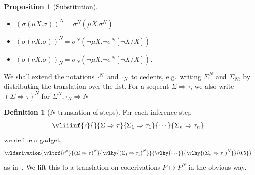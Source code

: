 \documentclass[10pt,a4paper]{amsart}
\theoremstyle{plain}
\newtheorem{proposition}[proposition]{Proposition}
\theoremstyle{definition}
\newtheorem{definition}[definition]{Definition}
\newcommand{\oldtodo}[1]{\todo{#1}} %
\newcommand{\red}[1]{{\color{red}#1}}
\renewcommand{\todo}[1]{}
\newcommand{\todonew}[1]{{\red{TodoNew: #1}}}
\renewcommand{\todonew}[1]{}
\theoremstyle{plain}
\theoremstyle{definition} %
\newcommand{\nat}{\mathit{N}}
\newcommand{\N}{\nat} %
\newcommand{\seqar}{\Rightarrow}
\newcommand{\infrule}{\mathsf{r}}
\newcommand{\rrule}{\infrule} %
\newcommand{\der}{P}
\newcommand{\negtrans}[1]{{#1}^{\N}}
\newcommand{\unnegtrans}[1]{{#1}_{\N}}
\begin{document}
\begin{proposition}
    [Substitution]{\ }
    \todonew{what are the invariants? also mixed notations below, be consistent.}
    \begin{itemize}
    \item $\negtrans{(\sigma (\mu X. \sigma  ))}=\negtrans{\sigma}(\mu X. \negtrans{\sigma}) $
    \item $\negtrans{(\sigma (\nu X. \sigma))} = \negtrans{\sigma}(\neg \mu X. \neg \negtrans{\sigma}[\neg X/X])$
     \item $\unnegtrans{(\sigma (\nu X. \sigma))} = \unnegtrans{\sigma}(\neg \mu X. \neg \negtrans{\sigma}[\neg X/X])$.
    \end{itemize}
\end{proposition}

We shall extend the notations $\negtrans \cdot$ and $\unnegtrans \cdot$ to cedents, e.g.\ writing $\negtrans {\Sigma}$ and $\unnegtrans {\Sigma}$, by distributing the translation over the list.
For a sequent $\Sigma \seqar \tau$, we also write $\negtrans{(\Sigma \seqar \tau)}$ for $\negtrans{\Sigma} , \unnegtrans \tau \seqar \N$





\begin{definition}
    [$N$-translation of steps]
    For each inference step \[\vliiinf{\rrule}{}{\Sigma \seqar \tau}{\Sigma_1 \seqar \tau_1}{\cdots }{\Sigma_n \seqar \tau_n}\] we define a gadget,
    \[
    \toks0={0.5}
    \vlderivation{
    \vltrf{\negtrans \rrule}{\negtrans{(\Sigma \seqar \tau)}}{\vlhy{\negtrans{(\Sigma_1 \seqar \tau_1)}}}{\vlhy{\cdots}}{\vlhy{\negtrans{(\Sigma_n \seqar \tau_n)}}}{\the\toks0}
    }
    \]
    as in~.
       We lift this to a translation on coderivations $\der \mapsto \negtrans \der$ in the obvious way.
\end{definition}
\end{document}
